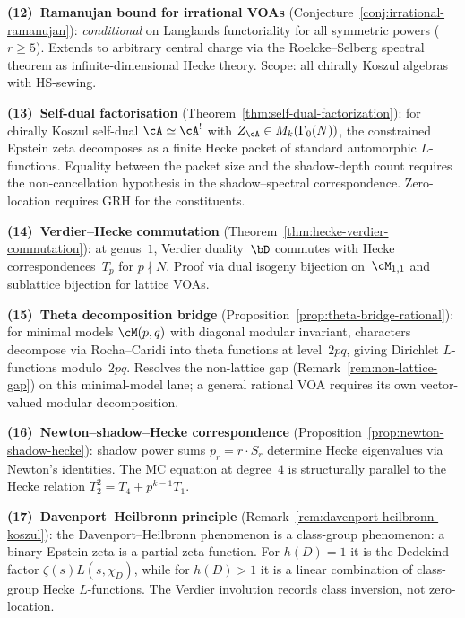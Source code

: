 \smallskip\noindent
\textbf{(12)~Ramanujan bound for irrational VOAs}
(Conjecture~\ref{conj:irrational-ramanujan}):
\emph{conditional} on Langlands functoriality for all symmetric
powers ($r \geq 5$). Extends to arbitrary central charge via
the Roelcke--Selberg spectral theorem as infinite-dimensional
Hecke theory. Scope: all chirally Koszul algebras with HS-sewing.

\smallskip\noindent
\textbf{(13)~Self-dual factorisation}
(Theorem~\ref{thm:self-dual-factorization}):
\ClaimStatusConditional{}
for chirally Koszul self-dual $\cA \simeq \cA^!$ with
$Z_\cA \in M_k(\Gamma_0(N))$, the constrained Epstein zeta
decomposes as a finite Hecke packet of standard automorphic
$L$-functions. Equality between the packet size and the shadow-depth
count requires the non-cancellation hypothesis in the shadow--spectral
correspondence. Zero-location requires GRH for the constituents.

\smallskip\noindent
\textbf{(14)~Verdier--Hecke commutation}
(Theorem~\ref{thm:hecke-verdier-commutation}):
\ClaimStatusProvedHere{}
at genus~$1$, Verdier duality~$\bD$ commutes with
Hecke correspondences~$T_p$ for $p\nmid N$.
Proof via dual isogeny bijection on~$\cM_{1,1}$
and sublattice bijection for lattice VOAs.

\smallskip\noindent
\textbf{(15)~Theta decomposition bridge}
(Proposition~\ref{prop:theta-bridge-rational}):
\ClaimStatusProvedHere{}
for minimal models $\cM(p,q)$ with diagonal modular invariant,
characters decompose via Rocha--Caridi into theta functions
at level~$2pq$, giving Dirichlet $L$-functions modulo~$2pq$.
Resolves the non-lattice gap
(Remark~\ref{rem:non-lattice-gap}) on this minimal-model lane; a
general rational VOA requires its own vector-valued modular
decomposition.

\smallskip\noindent
\textbf{(16)~Newton--shadow--Hecke correspondence}
(Proposition~\ref{prop:newton-shadow-hecke}):
\ClaimStatusProvedHere{}
shadow power sums $p_r = r\cdot S_r$ determine Hecke eigenvalues
via Newton's identities. The MC equation at degree~$4$ is
structurally parallel to the Hecke relation
$T_2^2 = T_4 + p^{k-1}T_1$.

\smallskip\noindent
\textbf{(17)~Davenport--Heilbronn principle}
(Remark~\ref{rem:davenport-heilbronn-koszul}):
\ClaimStatusProvedElsewhere{}
the Davenport--Heilbronn phenomenon is a class-group phenomenon:
a binary Epstein zeta is a partial zeta function. For $h(D)=1$ it is the
Dedekind factor $\zeta(s)L(s,\chi_D)$, while for $h(D)>1$ it is a
linear combination of class-group Hecke $L$-functions. The Verdier
involution records class inversion, not zero-location.

